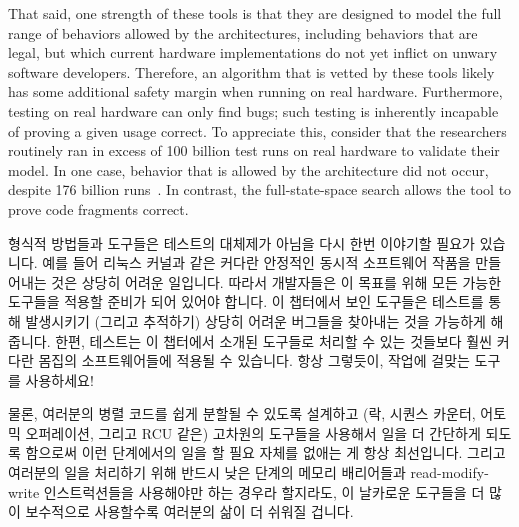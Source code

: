 That said, one strength of these tools is that they are designed to
model the full range of behaviors allowed by the architectures, including
behaviors that are legal, but which current hardware implementations do
not yet inflict on unwary software developers. Therefore, an algorithm
that is vetted by these tools likely has some additional safety margin
when running on real hardware. Furthermore, testing on real hardware can
only find bugs; such testing is inherently incapable of proving a given
usage correct. To appreciate this, consider that the researchers
routinely ran in excess of 100 billion test runs on real hardware to
validate their model.
In one case, behavior that is allowed by the architecture did not occur,
despite 176 billion runs~\cite{JadeAlglave2011ppcmem}.
In contrast, the
full-state-space search allows the tool to prove code fragments correct.
\fi

형식적 방법들과 도구들은 테스트의 대체제가 아님을 다시 한번 이야기할 필요가
있습니다.
예를 들어 리눅스 커널과 같은 커다란 안정적인 동시적 소프트웨어 작품을
만들어내는 것은 상당히 어려운 일입니다.
따라서 개발자들은 이 목표를 위해 모든 가능한 도구들을 적용할 준비가 되어 있어야
합니다.
이 챕터에서 보인 도구들은 테스트를 통해 발생시키기 (그리고 추적하기) 상당히
어려운 버그들을 찾아내는 것을 가능하게 해줍니다.
한편, 테스트는 이 챕터에서 소개된 도구들로 처리할 수 있는 것들보다 훨씬 커다란
몸집의 소프트웨어들에 적용될 수 있습니다.
항상 그렇듯이, 작업에 걸맞는 도구를 사용하세요!

물론, 여러분의 병렬 코드를 쉽게 분할될 수 있도록 설계하고 (락, 시퀀스 카운터,
어토믹 오퍼레이션, 그리고 RCU 같은) 고차원의 도구들을 사용해서 일을 더 간단하게
되도록 함으로써 이런 단계에서의 일을 할 필요 자체를 없애는 게 항상 최선입니다.
그리고 여러분의 일을 처리하기 위해 반드시 낮은 단계의 메모리 배리어들과
read-modify-write 인스트럭션들을 사용해야만 하는 경우라 할지라도, 이 날카로운
도구들을 더 많이 보수적으로 사용할수록 여러분의 삶이 더 쉬워질 겁니다.
\iffalse

It is worth repeating that formal methods and tools are no substitute for
testing. The fact is that producing large reliable concurrent software
artifacts, the Linux kernel for example, is quite difficult. Developers
must therefore be prepared to apply every tool at their disposal towards
this goal. The tools presented in this chapter are able to locate bugs that
are quite difficult to produce (let alone track down) via testing. On the
other hand, testing can be applied to far larger bodies of software than
the tools presented in this chapter are ever likely to handle. As always,
use the right tools for the job!

Of course, it is always best to avoid the need to work at this level
by designing your parallel code to be easily partitioned and then
using higher-level primitives (such as locks, sequence counters, atomic
operations, and RCU) to get your job done more straightforwardly. And even
if you absolutely must use low-level memory barriers and read-modify-write
instructions to get your job done, the more conservative your use of
these sharp instruments, the easier your life is likely to be.
\fi
